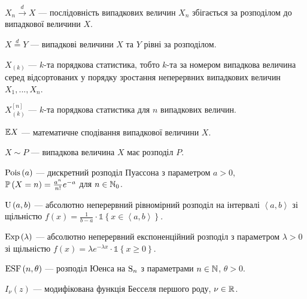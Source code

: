 $X_n \overset{d}{\longrightarrow} X$ --- послідовність випадкових величин $X_n$
збігається за розподілом до випадкової величини $X$.

$X \overset{d}{=} Y$ --- випадкові величини $X$ та $Y$ рівні за розподілом.

$X_{(k)}$ --- $k$-та порядкова статистика, тобто $k$-та за номером 
випадкова величина серед відсортованих у порядку зростання неперервних
випадкових величин $X_1, ..., X_n$.

$X_{(k)}^{[n]}$ --- $k$-та порядкова статистика для $n$ випадкових величин.

$\E X$ --- математичне сподівання випадкової величини $X$.

$X \sim P$ --- випадкова величина $X$ має розподіл $P$.

$\Poiss{a}$ --- дискретний розподіл Пуассона з параметром $a > 0$, $\P{X = n} = \frac{a^n}{n!}e^{-a}$ для $n \in \N_0$.

$\Unif{a, b}$ --- абсолютно неперервний рівномірний розподіл на інтервалі $\left<a,b\right>$ зі щільністю
$f(x) = \frac{1}{b-a} \cdot \mathds{1}\left\{x \in \left<a,b\right> \right\}$.

$\Exp{\lambda}$ --- абсолютно неперервний експоненційний розподіл з параметром $\lambda > 0$ зі щільністю
$f(x) = \lambda e^{-\lambda x} \cdot \mathds{1}\left\{x \geq 0\right\}$.

$\ESF{n, \theta}$ --- розподіл Юенса на $\Sym{n}$ з параметрами $n \in \N$, $\theta > 0$.

$I_{\nu}(z)$ --- модифікована функція Бесселя першого роду, $\nu \in \R$.